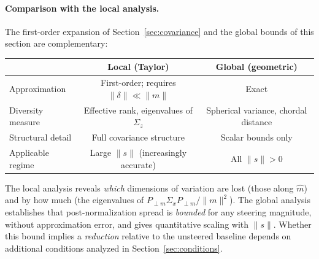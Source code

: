 \paragraph{Comparison with the local analysis.}
The first-order expansion of Section~\ref{sec:covariance} and the global
bounds of this section are complementary:

\begin{center}
\begin{tabular}{lcc}
  \toprule
  & \textbf{Local (Taylor)} & \textbf{Global (geometric)} \\
  \midrule
  Approximation & First-order; requires $\|\delta\| \ll \|m\|$ & Exact \\
  Diversity measure & Effective rank, eigenvalues of $\Sigma_z$ & Spherical variance, chordal distance \\
  Structural detail & Full covariance structure & Scalar bounds only \\
  Applicable regime & Large $\|s\|$ (increasingly accurate) & All $\|s\| > 0$ \\
  \bottomrule
\end{tabular}
\end{center}

\noindent
The local analysis reveals \emph{which} dimensions of variation are lost
(those along $\hat{m}$) and by how much (the eigenvalues of
$P_{\perp m}\Sigma_x P_{\perp m}/\|m\|^2$).
The global analysis establishes that post-normalization spread is \emph{bounded}
for any steering magnitude, without approximation error, and gives
quantitative scaling with $\|s\|$.
Whether this bound implies a \emph{reduction} relative to the unsteered
baseline depends on additional conditions analyzed in
Section~\ref{sec:conditions}.